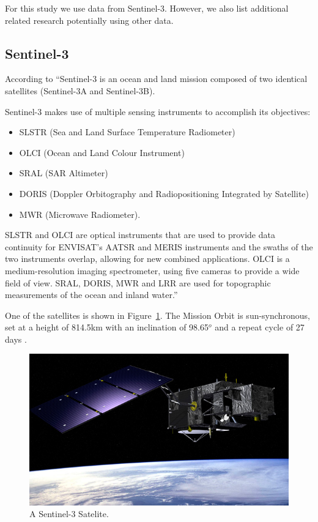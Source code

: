 \documentclass[sigplan,screen]{acmart}
\begin{document}
For this study we use data from Sentinel-3. However, we also list additional related research potentially using other data. 

\subsection{Sentinel-3}

According to \cite{Sentinel84:online}
``Sentinel-3 is an ocean and land mission composed of two identical satellites (Sentinel-3A and Sentinel-3B). 

Sentinel-3 makes use of multiple sensing instruments to accomplish its objectives:

\begin{itemize}
    \item SLSTR (Sea and Land Surface Temperature Radiometer)
\item OLCI (Ocean and Land Colour Instrument)
\item SRAL (SAR Altimeter)
\item DORIS (Doppler Orbitography and Radiopositioning Integrated by Satellite)
\item MWR (Microwave Radiometer).

\end{itemize}

SLSTR and OLCI are optical instruments that are used to provide data continuity for ENVISAT's AATSR and MERIS instruments and the swaths of the two instruments overlap, allowing for new combined applications. OLCI is a medium-resolution imaging spectrometer, using five cameras to provide a wide field of view.
SRAL, DORIS, MWR and LRR are used for topographic measurements of the ocean and inland water.''

One of the satellites is shown in Figure~\ref{fig:sat}. The 
Mission Orbit is 
sun-synchronous, set at a height of  814.5km
with an inclination of 98.65$^{o}$ and a repeat cycle of 27 days \cite{Sentinel84:online}.


\begin{figure}[htb]
\centering\includegraphics[width=0.8\columnwidth]{images/sentinel-3.jpg}
\caption{A Sentinel-3 Satelite.}
\label{fig:sat}
\end{figure}
\end{document}
